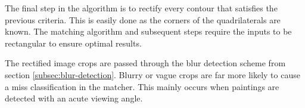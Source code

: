 The final step in the algorithm is to rectify every contour that satisfies the previous criteria. This is easily done as the corners of the quadrilaterals are known. The matching algorithm and subsequent steps require the inputs to be rectangular to ensure optimal results.

The rectified image crops are passed through the blur detection scheme from section \ref{subsec:blur-detection}. Blurry or vague crops are far more likely to cause a miss classification in the matcher. This mainly occurs when paintings are detected with an acute viewing angle.

\begin{figure}[htbp]
\end{figure}
